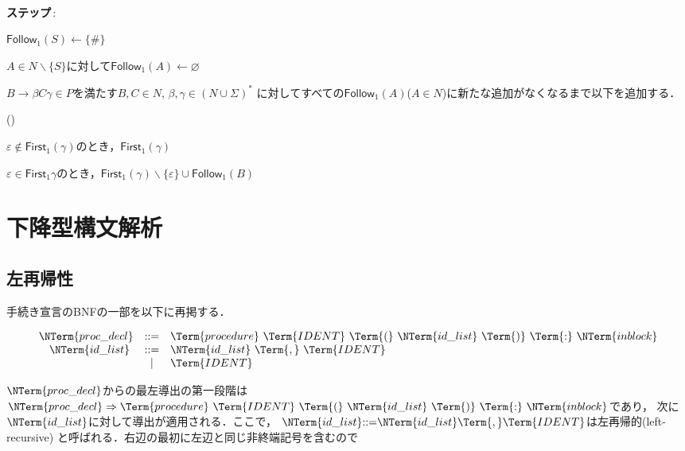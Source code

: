 \documentclass[dvipdfmx,a4j]{jbook}
\newcounter{coffee}
\newcounter{bean}
\begin{document}
\begin{Alg}\ 
  \begin{list}{{\bf ステップ}\,{\rm {}:}}{}
    \item $\mathsf{Follow}_1(S)\leftarrow\{\#\}$
    \item $A\in N\backslash\{S\}$に対して$\mathsf{Follow}_1(A)\leftarrow\varnothing$
    \item 
    $B\rightarrow\beta C\gamma\in P$を満たす$B,C\in N$, $\beta,\gamma\in(N\cup\Sigma)^\ast$
    に対してすべての$\mathsf{Follow}_1(A)$($A\in N$)に新たな追加がなくなるまで以下を追加する．
    \begin{list}{(\alph{bean})}{\usecounter{bean}}
      \item $\varepsilon\notin\mathsf{First}_1(\gamma)$のとき，$\mathsf{First}_1(\gamma)$
      \item $\varepsilon\in\mathsf{First}_1{\gamma}$のとき，$\mathsf{First}_1(\gamma)\backslash\{\varepsilon\}\cup\mathsf{Follow}_1(B)$
    \end{list}
  \end{list}
\end{Alg}

\section{下降型構文解析}

\subsection{左再帰性}

手続き宣言のBNFの一部を以下に再掲する．

\[\begin{array}{rcl}
\NTerm{proc\_decl} & \mathtt{::=} & \Term{procedure}\ \Term{IDENT}\ \Term{(}\ 
\NTerm{id\_list}\ \Term{)}\ \Term{:}\ \NTerm{inblock}\\
\NTerm{id\_list}\ & \mathtt{::=} & \NTerm{id\_list}\ \Term{,}\ \Term{IDENT}\\
& | & \Term{IDENT}\\
\end{array}\]

$\NTerm{proc\_decl}$からの最左導出の第一段階は
$\NTerm{proc\_decl}\Rightarrow\Term{procedure}\ \Term{IDENT}\ \Term{(}\ \NTerm{id\_list}\ \Term{)}\ \Term{:}\ \NTerm{inblock}$であり，
次に$\NTerm{id\_list}$に対して導出が適用される．ここで，
$\NTerm{id\_list}\mathtt{::=}\NTerm{id\_list}\Term{,}\Term{IDENT}$は左再帰的(left-recursive)
と呼ばれる．右辺の最初に左辺と同じ非終端記号を含むので
\end{document}
